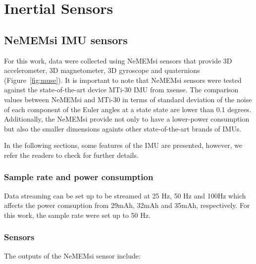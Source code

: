 


\graphicspath{{figs/appendixB/PDF/}}

%
%
\chapter{Inertial Sensors} \label{appendix:b}

\section{NeMEMsi IMU sensors}
For this work, data were collected using NeMEMsi sensors \cite{Comotti2014}
that provide 3D accelerometer, 3D magnetometer, 3D gyroscope and quaternions
(Figure~\ref{fig:muse}).
It is important to note that NeMEMsi sensors 
were tested against the state-of-the-art device MTi-30 IMU from xsense.
The comparison values between NeMEMsi and MTi-30 in terms of standard deviation 
of the noise of each component of the Euler angles at a state state are lower than
0.1 degrees. 
Additionally, the NeMEMsi provide not only to have a lower-power consumption 
but also the smaller dimensions againts other state-of-the-art brands of IMUs.

In the following sections, some features of the IMU are presented,
however, we refer the readers to check \cite{Comotti2014} for further details.

\subsection*{Sample rate and power consumption}
Data streaming can be set up to be streamed at 25 Hz, 50 Hz and 100Hz which
affects the power comsuption from 29mAh, 32mAh and 35mAh, respectively.
For this work, the sample rate were set up to 50 Hz.

\subsection*{Sensors}
The outputs of the NeMEMsi sensor include:

